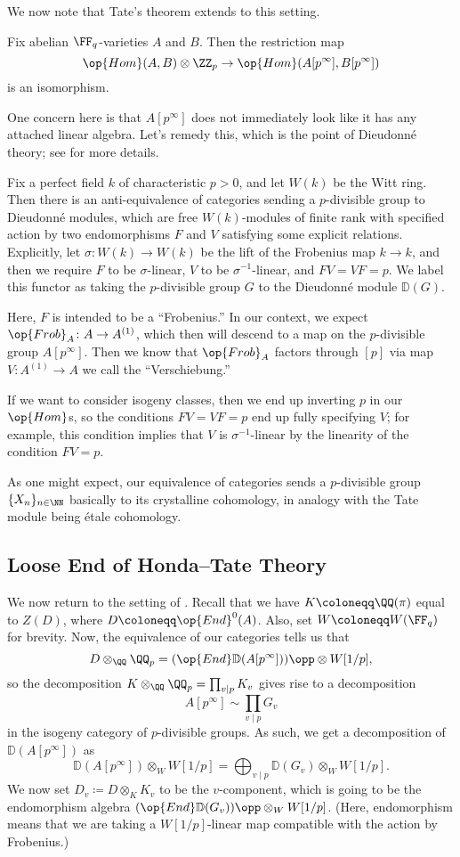 \documentclass[../notes.tex]{subfiles}
\begin{document}
We now note that Tate's theorem extends to this setting.
\begin{theorem}
	Fix abelian $\FF_q$-varieties $A$ and $B$. Then the restriction map
	\[\op{Hom}(A,B)\otimes\ZZ_p\to\op{Hom}(A[p^\infty],B[p^\infty])\]
	is an isomorphism.
\end{theorem}
One concern here is that $A\left[p^\infty\right]$ does not immediately look like it has any attached linear algebra. Let's remedy this, which is the point of Dieudonn\'e theory; see \cite[Appendix~A.1]{chai-cm-lifting} for more details.
\begin{theorem}[Dieudonn\'e]
	Fix a perfect field $k$ of characteristic $p>0$, and let $W(k)$ be the Witt ring. Then there is an anti-equivalence of categories sending a $p$-divisible group to Dieudonn\'e modules, which are free $W(k)$-modules of finite rank with specified action by two endomorphisms $F$ and $V$ satisfying some explicit relations. Explicitly, let $\sigma\colon W(k)\to W(k)$ be the lift of the Frobenius map $k\to k$, and then we require $F$ to be $\sigma$-linear, $V$ to be $\sigma^{-1}$-linear, and $FV=VF=p$. We label this functor as taking the $p$-divisible group $G$ to the Dieudonn\'e module $\mathbb D(G)$.
\end{theorem}
Here, $F$ is intended to be a ``Frobenius.''
In our context, we expect $\op{Frob}_A\colon A\to A^{(1)}$, which then will descend to a map on the $p$-divisible group $A\left[p^\infty\right]$. Then we know that $\op{Frob}_A$ factors through $[p]$ via map $V\colon A^{(1)}\to A$ we call the ``Verschiebung.''
\begin{remark}
	If we want to consider isogeny classes, then we end up inverting $p$ in our $\op{Hom}$s, so the conditions $FV=VF=p$ end up fully specifying $V$; for example, this condition implies that $V$ is $\sigma^{-1}$-linear by the linearity of the condition $FV=p$.
\end{remark}
As one might expect, our equivalence of categories sends a $p$-divisible group $\{X_n\}_{n\in\NN}$ basically to its crystalline cohomology, in analogy with the Tate module being \'etale cohomology.

\subsection{Loose End of Honda--Tate Theory}
We now return to the setting of . Recall that we have $K\coloneqq\QQ(\pi)$ equal to $Z(D)$, where $D\coloneqq\op{End}^0(A)$. Also, set $W\coloneqq W(\FF_q)$ for brevity. Now, the equivalence of our categories tells us that
\[D\otimes_\QQ\QQ_p=(\op{End}\mathbb D(A[p^\infty]))\opp\otimes W[1/p],\]
so the decomposition $K\otimes_\QQ\QQ_p=\prod_{v\mid p}K_v$ gives rise to a decomposition
\[A[p^\infty]\sim\prod_{v\mid p}G_v\]
in the isogeny category of $p$-divisible groups. As such, we get a decomposition of $\mathbb D(A[p^\infty])$ as
\[\mathbb D(A[p^\infty])\otimes_WW[1/p]=\bigoplus_{v\mid p}\mathbb D(G_v)\otimes_WW[1/p].\]
We now set $D_v\coloneqq D\otimes_KK_v$ to be the $v$-component, which is going to be the endomorphism algebra $(\op{End}\mathbb D(G_v))\opp\otimes_WW[1/p]$. (Here, endomorphism means that we are taking a $W[1/p]$-linear map compatible with the action by Frobenius.)
\end{document}
